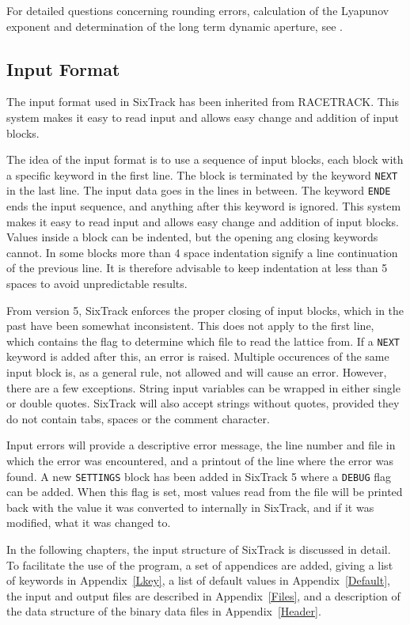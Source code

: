 For detailed questions concerning rounding errors, calculation of the Lyapunov exponent and determination of the long term dynamic aperture, see \cite{thesis}.

\subsection{Input Format} \label{sec:informat}

The input format used in SixTrack has been inherited from RACETRACK.
This system makes it easy to read input and allows easy change and addition of input blocks.

The idea of the input format is to use a sequence of input blocks, each block with a specific keyword in the first line.
The block is terminated by the keyword \texttt{NEXT} in the last line.
The input data goes in the lines in between.
The keyword \texttt{ENDE} ends the input sequence, and anything after this keyword is ignored.
This system makes it easy to read input and allows easy change and addition of input blocks.
Values inside a block can be indented, but the opening ang closing keywords cannot.
In some blocks more than 4 space indentation signify a line continuation of the previous line.
It is therefore advisable to keep indentation at less than 5 spaces to avoid unpredictable results.

From version 5, SixTrack enforces the proper closing of input blocks, which in the past have been somewhat inconsistent.
This does not apply to the first line, which contains the flag to determine which file to read the lattice from.
If a \texttt{NEXT} keyword is added after this, an error is raised.
Multiple occurences of the same input block is, as a general rule, not allowed and will cause an error.
However, there are a few exceptions.
String input variables can be wrapped in either single or double quotes.
SixTrack will also accept strings without quotes, provided they do not contain tabs, spaces or the comment character.

Input errors will provide a descriptive error message, the line number and file in which the error was encountered, and a printout of the line where the error was found.
A new \texttt{SETTINGS} block has been added in SixTrack 5 where a \texttt{DEBUG} flag can be added.
When this flag is set, most values read from the file will be printed back with the value it was converted to internally in SixTrack, and if it was modified, what it was changed to.

In the following chapters, the input structure of SixTrack is discussed in detail.
To facilitate the use of the program, a set of appendices are added, giving a list of keywords in Appendix~\ref{Lkey}, a list of default values in  Appendix~\ref{Default}, the input and output files are described in Appendix~\ref{Files}, and a description of the data structure of the binary data files in Appendix~\ref{Header}.
